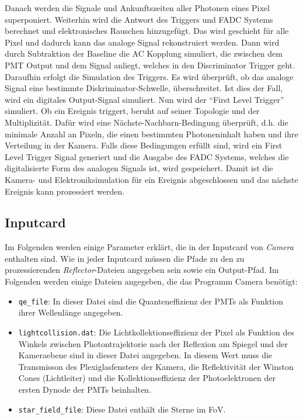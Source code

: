 Danach werden die Signale und Ankunftszeiten aller Photonen eines Pixel superponiert.
Weiterhin wird die Antwort des Triggers und FADC Systems berechnet und elektronisches Rauschen hinzugefügt.
Das wird geschieht für alle Pixel und dadurch kann das analoge Signal rekonstruiert werden.
Dann wird durch Subtraktion der Baseline die AC Kopplung simuliert, die zwischen dem PMT Output und dem Signal anliegt, welches in den Discriminator Trigger geht.
Daraufhin erfolgt die Simulation des Triggers. 
Es wird überprüft, ob das analoge Signal eine bestimmte Diskriminator-Schwelle, überschreitet.
Ist dies der Fall, wird ein digitales Output-Signal simuliert.
Nun wird der ``First Level Trigger'' simuliert.
Ob ein Ereignis triggert, beruht auf seiner Topologie und der Multiplizität.
Dafür wird eine Nächste-Nachbarn-Bedingung überprüft, d.h. die minimale Anzahl an Pixeln, die einen bestimmten Photoneninhalt haben und ihre Verteilung in der Kamera.
Falls diese Bedingungen erfüllt sind, wird ein First Level Trigger Signal generiert und die Ausgabe des FADC Systems, welches die digitalisierte Form des analogen Signals ist, wird gespeichert.
Damit ist die Kamera- und Elektroniksimulation für ein Ereignis abgeschlossen und das nächste Ereignis kann prozessiert werden.

\subsection{Inputcard}
Im Folgenden werden einige Parameter erklärt, die in der Inputcard von \textit{Camera} enthalten sind.
Wie in jeder Inputcard müssen die Pfade zu den zu prozessierenden \textit{Reflector}-Dateien angegeben sein sowie ein Output-Pfad.
Im Folgenden werden einige Dateien angegeben, die das Programm Camera benötigt:

\begin{itemize}
 \item \texttt{qe\_file}: In dieser Datei sind die Quanteneffizienz der PMTs als Funktion ihrer Wellenlänge angegeben.
 \item \texttt{lightcollision.dat}: Die Lichtkollektionseffizienz der Pixel als Funktion des Winkels zwischen Photontrajektorie nach der Reflexion am Spiegel und der Kameraebene sind in dieser Datei angegeben.
 In diesem Wert muss die Transmisson des Plexiglasfensters der Kamera, die Reflektivität der Winston Cones (Lichtleiter) und die Kollektionseffizienz der Photoelektronen der ersten Dynode der PMTs beinhalten.
 \item \texttt{star\_field\_file}: Diese Datei enthält die Sterne im FoV.
\end{itemize}

